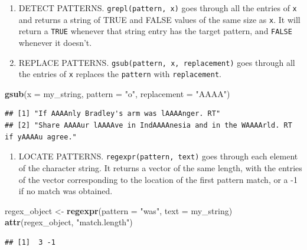 \documentclass[]{book}
\newenvironment{Shaded}{\begin{snugshade}}{\end{snugshade}}
\newcommand{\DataTypeTok}[1]{\textcolor[rgb]{0.13,0.29,0.53}{#1}}
\newcommand{\KeywordTok}[1]{\textcolor[rgb]{0.13,0.29,0.53}{\textbf{#1}}}
\newcommand{\NormalTok}[1]{#1}
\newcommand{\StringTok}[1]{\textcolor[rgb]{0.31,0.60,0.02}{#1}}
\providecommand{\tightlist}{%
  \setlength{\itemsep}{0pt}\setlength{\parskip}{0pt}}
\theoremstyle{definition}
\theoremstyle{definition}
\theoremstyle{definition}
\theoremstyle{remark}
\begin{document}
\begin{enumerate}
\def\labelenumi{\arabic{enumi}.}
\item
  DETECT PATTERNS. \texttt{grepl(pattern,\ x)} goes through all the entries of \texttt{x} and returns a string of TRUE and FALSE values of the same size as \texttt{x}. It will return a \texttt{TRUE} whenever that string entry has the target pattern, and \texttt{FALSE} whenever it doesn't.
\item
  REPLACE PATTERNS. \texttt{gsub(pattern,\ x,\ replacement)} goes through all the entries of \texttt{x} replaces the \texttt{pattern} with \texttt{replacement}.
\end{enumerate}

\begin{Shaded}
\begin{Highlighting}[]
\KeywordTok{gsub}\NormalTok{(}\DataTypeTok{x =}\NormalTok{ my_string,}
     \DataTypeTok{pattern =} \StringTok{"o"}\NormalTok{, }
     \DataTypeTok{replacement =} \StringTok{"AAAA"}\NormalTok{)}
\end{Highlighting}
\end{Shaded}

\begin{verbatim}
## [1] "If AAAAnly Bradley's arm was lAAAAnger. RT"                                   
## [2] "Share AAAAur lAAAAve in IndAAAAnesia and in the WAAAArld. RT if yAAAAu agree."
\end{verbatim}

\begin{enumerate}
\def\labelenumi{\arabic{enumi}.}
\setcounter{enumi}{2}
\tightlist
\item
  LOCATE PATTERNS. \texttt{regexpr(pattern,\ text)} goes through each element of the character string. It returns a vector of the same length, with the entries of the vector corresponding to the location of the first pattern match, or a -1 if no match was obtained.
\end{enumerate}

\begin{Shaded}
\begin{Highlighting}[]
\NormalTok{regex_object <-}\StringTok{ }\KeywordTok{regexpr}\NormalTok{(}\DataTypeTok{pattern =} \StringTok{"was"}\NormalTok{,  }\DataTypeTok{text =}\NormalTok{ my_string)}
\KeywordTok{attr}\NormalTok{(regex_object, }\StringTok{"match.length"}\NormalTok{)}
\end{Highlighting}
\end{Shaded}

\begin{verbatim}
## [1]  3 -1
\end{verbatim}
\end{document}
